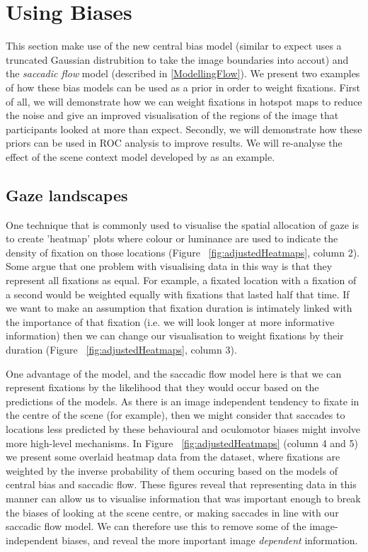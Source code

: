 \section{Using Biases}

This section make use of the new central bias model (similar to \cite{clarke-tatler2014} expect uses a truncated Gaussian distrubition to take the image boundaries into accout) and the \textit{saccadic flow} model (described in \ref{ModellingFlow}). We present two examples of how these bias models can be used as a prior in order to weight fixations. First of all, we will demonstrate how we can weight fixations in hotspot maps to reduce the noise and give an improved visualisation of the regions of the image that participants looked at more than expect. Secondly, we will demonstrate how these priors can be used in ROC analysis to improve results. We will re-analyse the effect of the scene context model developed by  \cite{ehinger2009} as an example. 

\subsection{Gaze landscapes}

One technique that is commonly used to visualise the spatial allocation of gaze is to create 'heatmap' plots where colour or luminance are used to indicate the density of fixation on those locations (Figure ~\ref{fig:adjustedHeatmaps}, column 2). Some argue that one problem with visualising data in this way is that they represent all fixations as equal. For example, a fixated location with a fixation of a second would be weighted equally with fixations that lasted half that time. If we want to make an assumption that fixation duration is intimately linked with the importance of that fixation (i.e. we will look longer at more informative information) then we can change our visualisation to weight fixations by their duration (Figure ~\ref{fig:adjustedHeatmaps}, column 3).

One advantage of the \citep{clarke-tatler2014} model, and the saccadic flow model here is that we can represent fixations by the likelihood that they would occur based on the predictions of the models. As there is an image independent tendency to fixate in the centre of the scene (for example), then we might consider that saccades to locations less predicted by these behavioural and oculomotor biases might involve more high-level mechanisms. In Figure ~\ref{fig:adjustedHeatmaps} (column 4 and 5) we present some overlaid heatmap data from the \citep{clarke2013} dataset, where fixations are weighted by the inverse probability of them occuring based on the models of central bias and saccadic flow. These figures reveal that representing data in this manner can allow us to visualise information that was important enough to break the biases of looking at the scene centre, or making saccades in line with our saccadic flow model. We can therefore use this to remove some of the image-independent biases, and reveal the more important image \emph{dependent} information.


